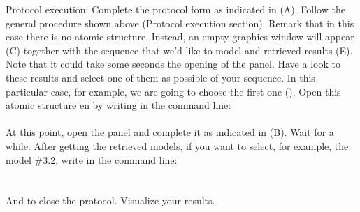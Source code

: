 \begin{itemize}
                Protocol execution: Complete the protocol form as indicated in  (A). Follow the general procedure shown above (Protocol execution section). Remark that in this case there is no  atomic structure. Instead, an empty \chimera graphics window will appear (C) together with the  sequence that we'd like to model and  retrieved results (E). Note that it could take some seconds the opening of the  panel. Have a look to these results and select one of them as possible  of your  sequence. In this particular case, for example, we are going to choose the first one (). Open this atomic structure en \chimera by writing in the command line:\\
                \\
                At this point, open the  panel and complete it as indicated in  (B). Wait for a while. After getting the retrieved models, if you want to select, for example, the  model {\#3.2}, write in the command line:\\
                \\
                \\
                And \chimera {} to close the protocol. Visualize your results.
                            
\end{itemize}
